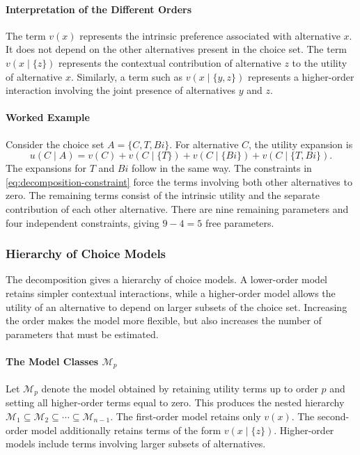 \documentclass[11pt,a4paper]{article}
\begin{document}
\paragraph{Interpretation of the Different Orders}
The term $v(x)$ represents the intrinsic preference associated with
alternative $x$. It does not depend on the other alternatives present in the
choice set.
The term $v(x\mid\{z\})$ represents the contextual contribution of
alternative $z$ to the utility of alternative $x$. Similarly, a term such as
$v(x\mid\{y,z\})$ represents a higher-order interaction involving the joint
presence of alternatives $y$ and $z$.
\paragraph{Worked Example}
Consider the choice set $A=\{C,T,Bi\}$. For alternative $C$, the utility expansion is
\[
    u(C\mid A)=v(C)+v(C\mid\{T\})+v(C\mid\{Bi\})+v(C\mid\{T,Bi\}).
\]
The expansions for $T$ and $Bi$ follow in the same way. The constraints in \cref{eq:decomposition-constraint} force the terms involving both other alternatives to zero. The remaining terms consist of the intrinsic utility and the separate contribution of each other alternative. There are nine remaining parameters and four independent constraints, giving $9-4=5$ free parameters.

\subsubsection[Model hierarchy]{Hierarchy of Choice Models}
The decomposition gives a hierarchy of choice models. A lower-order model
retains simpler contextual interactions, while a higher-order model allows the
utility of an alternative to depend on larger subsets of the choice set.
Increasing the order makes the model more flexible, but also increases the
number of parameters that must be estimated.
\paragraph{The Model Classes $\mathcal{M}_p$}
Let $\mathcal{M}_p$ denote the model obtained by retaining utility terms up to
order $p$ and setting all higher-order terms equal to zero. This produces the
nested hierarchy
\(\mathcal{M}_1 \subseteq \mathcal{M}_2 \subseteq \cdots \subseteq \mathcal{M}_{n-1}.\)
The first-order model retains only $v(x)$. The second-order model additionally
retains terms of the form $v(x\mid\{z\})$. Higher-order models include terms
involving larger subsets of alternatives.
\end{document}
